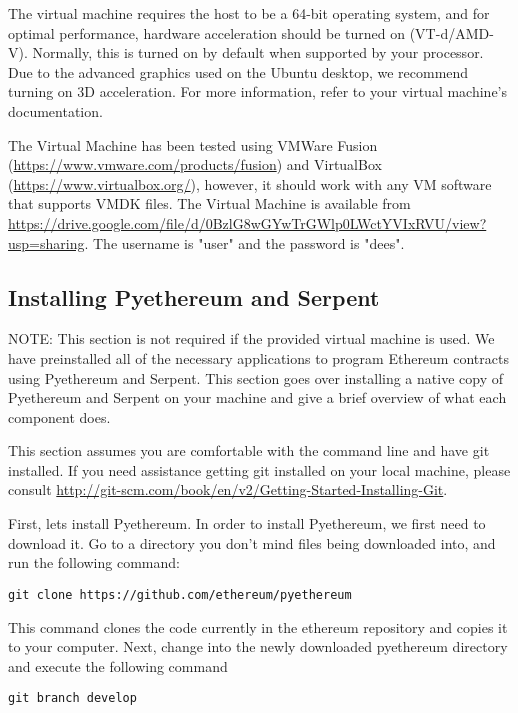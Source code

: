 \documentclass[12pt]{article}
\begin{document}
The virtual machine requires the host to be a 64-bit operating system, and for optimal performance, hardware acceleration should be turned on (VT-d/AMD-V). Normally, this is turned on by default when supported by your processor. Due to the advanced graphics used on the Ubuntu desktop, we recommend turning on 3D acceleration. For more information, refer to your virtual machine's documentation.

The Virtual Machine has been tested using VMWare Fusion (\url{https://www.vmware.com/products/fusion}) and VirtualBox (\url{https://www.virtualbox.org/}), however, it should work with any VM software that supports VMDK files. The Virtual Machine is available from \url{https://drive.google.com/file/d/0BzlG8wGYwTrGWlp0LWctYVIxRVU/view?usp=sharing}. The username is "user" and the password is "dees". 

\subsection{Installing Pyethereum and Serpent}
\begin{framed}
NOTE: This section is not required if the provided virtual machine is used. We have preinstalled all of the necessary applications to program Ethereum contracts using Pyethereum and Serpent. This section goes over installing a native copy of Pyethereum and Serpent on your machine and give a brief overview of what each component does.
\end{framed}

This section assumes you are comfortable with the command line and have git installed. If you need assistance getting git installed on your local machine, please consult \url{http://git-scm.com/book/en/v2/Getting-Started-Installing-Git}.

First, lets install Pyethereum. 
In order to install Pyethereum, we first need to download it. Go to a directory you don't mind files being downloaded into, and run the following command:

\begin{verbatim}
git clone https://github.com/ethereum/pyethereum
\end{verbatim}

This command clones the code currently in the ethereum repository and copies it to your computer. Next, change into the newly downloaded pyethereum directory and execute the following command

\begin{verbatim}
git branch develop
\end{verbatim}
\end{document}
